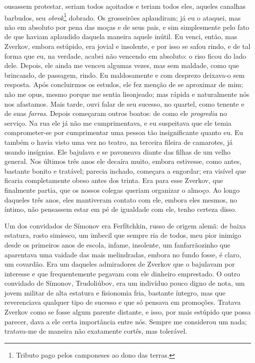 ousassem protestar, seriam todos açoitados e teriam todos eles, aqueles
canalhas barbudos, seu \textit{obrok}\footnote{ Tributo pago pelos camponeses
ao dono das terras.} dobrado. Os grosseirões aplaudiram; já eu o ataquei, mas
não em absoluto por pena das moças e de seus pais, e sim simplesmente pelo fato
de que haviam aplaudido daquela maneira aquele inútil. Eu venci, então, mas
Zverkov, embora estúpido, era jovial e insolente, e por isso se safou rindo, e
de tal forma que eu, na verdade, acabei não vencendo em absoluto: o riso ficou
do lado dele.  Depois, ele ainda me venceu algumas vezes, mas sem maldade, como
que brincando, de passagem, rindo. Eu maldosamente e com desprezo deixava-o sem
resposta. Após concluirmos os estudos, ele fez menção de se aproximar de mim;
não me opus, mesmo porque me sentia lisonjeado; mas rápida e naturalmente nós
nos afastamos. Mais tarde, ouvi falar de seu sucesso, no quartel, como tenente
e de suas \textit{farras}. Depois começaram outros boatos: de como ele
\textit{progredia} no serviço. Na rua ele já não me cumprimentava, e eu
suspeitava que ele temia comprometer-se por cumprimentar uma pessoa tão
insignificante quanto eu. Eu também o havia visto uma vez no teatro, na
terceira fileira de camarotes, já usando insígnias. Ele bajulava e se pavoneava
diante das filhas de um velho general. Nos últimos três anos ele decaíra muito,
embora estivesse, como antes, bastante bonito e tratável; parecia inchado,
começara a engordar; era visível que ficaria completamente obeso antes dos
trinta. Era para esse Zverkov, que finalmente partia, que os nossos colegas
queriam organizar o almoço. Ao longo daqueles três anos, eles mantiveram
contato com ele, embora eles mesmos, no íntimo, não pensassem estar em pé de
igualdade com ele, tenho certeza disso.

Um dos convidados de Símonov era Ferfítchkin, russo de origem alemã: de
baixa estatura, rosto simiesco, um imbecil que sempre ria de todos, meu
pior inimigo desde os primeiros anos de escola, infame, insolente, um
fanfarrãozinho que aparentava uma vaidade das mais melindradas, embora
no fundo fosse, é claro, um covardão. Era um daqueles admiradores de
Zverkov que o bajulavam por interesse e que frequentemente pegavam com
ele dinheiro emprestado. O outro convidado de Símonov, Trudoliúbov, era
um indivíduo pouco digno de nota, um jovem militar de alta estatura e
fisionomia fria, bastante íntegro, mas que reverenciava qualquer tipo
de sucesso e que só pensava em promoções. Tratava Zverkov como se fosse
algum parente distante, e isso, por mais estúpido que possa parecer,
dava a ele certa importância entre nós. Sempre me considerou um nada;
tratava-me de maneira não exatamente cortês, mas tolerável.

